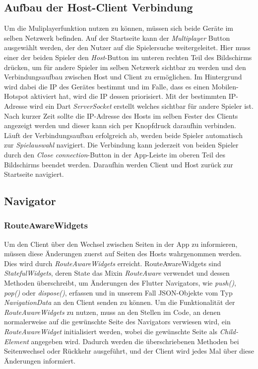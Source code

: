 \subsection{Aufbau der Host-Client Verbindung}
Um die Muliplayerfunktion nutzen zu können, müssen sich beide Geräte im selben Netzwerk befinden. Auf der Startseite kann der \textit{Multiplayer} Button ausgewählt werden, der den Nutzer auf die Spielersuche weitergeleitet. Hier muss einer der beiden Spieler den \textit{Host}-Button im unteren rechten Teil des Bildschirms drücken, um für andere Spieler im selben Netzwerk sichtbar zu werden und den Verbindungsaufbau zwischen Host und Client zu ermöglichen. Im Hintergrund wird dabei die IP des Gerätes bestimmt und im Falle, dass es einen Mobilen-Hotspot aktiviert hat, wird die IP dessen priorisiert. Mit der bestimmten IP-Adresse wird ein Dart \textit{ServerSocket} erstellt welches sichtbar für andere Spieler ist.
\newline
Nach kurzer Zeit sollte die IP-Adresse des Hosts im selben Fester des Clients angezeigt werden und dieser kann sich per Knopfdruck daraufhin verbinden. Läuft der Verbindungsaufbau erfolgreich ab, werden beide Spieler automatisch zur \textit{Spielauswahl} navigiert.
\newline
\newline
Die Verbindung kann jederzeit von beiden Spieler durch den \textit{Close connection}-Button in der App-Leiste im oberen Teil des Bildschirms beendet werden. Daraufhin werden Client und Host zurück zur Startseite navigiert.

\subsection{Navigator}

\subsubsection{RouteAwareWidgets}
Um den Client über den Wechsel zwischen Seiten in der App zu informieren, müssen diese Änderungen zuerst auf Seiten des Hosts wahrgenommen werden. Dies wird durch \textit{RouteAwareWidgets} erreicht.
\newline
\newline
RouteAwareWidgets sind \textit{StatefulWidgets}, deren State das Mixin \textit{RouteAware} verwendet und dessen Methoden überschreibt, um Änderungen des Flutter Navigators, wie \textit{push()}, \textit{pop()} oder \textit{dispose()}, erfassen und in unserem Fall JSON-Objekte vom Typ \textit{NavigationData} an den Client senden zu können.
\newline
\newline
Um die Funktionalität der \textit{RouteAwareWidgets} zu nutzen, muss an den Stellen im Code, an denen normalerweise auf die gewünschte Seite des Navigators verwiesen wird, ein \textit{RouteAwareWidget} initialisiert werden, wobei die gewünschte Seite als \textit{Child-Element} angegeben wird.
\newline
Dadurch werden die überschriebenen Methoden bei Seitenwechsel oder Rückkehr ausgeführt, und der Client wird jedes Mal über diese Änderungen informiert.

